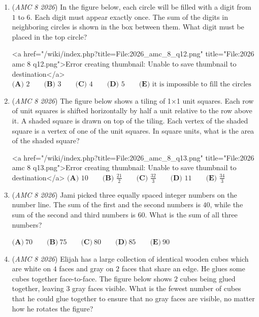 \begin{enumerate}
 <a href="/wiki/index.php?title=File:2026\_amc\_8\_q11.png" title="File:2026 amc 8 q11.png">Error creating thumbnail: Unable to save thumbnail to destination</a>$\textbf{(A) } 4\pi\qquad\textbf{(B) } 6\pi\qquad\textbf{(C) } \frac{13}{2}\pi\qquad\textbf{(D) } 8\pi\qquad\textbf{(E) } 13\pi$


	\item (\textit{AMC 8 2026}) In the figure below, each circle will be filled with a digit from $1$ to $6$. Each digit must appear exactly once.
The sum of the digits in neighboring circles is shown in the box between them.
What digit must be placed in the top circle?


 <a href="/wiki/index.php?title=File:2026\_amc\_8\_q12.png" title="File:2026 amc 8 q12.png">Error creating thumbnail: Unable to save thumbnail to destination</a>
$\textbf{(A) } 2\qquad\textbf{(B) } 3\qquad\textbf{(C) } 4\qquad\textbf{(D) } 5\qquad\textbf{(E) } \text{it is impossible to fill the circles}$


	\item (\textit{AMC 8 2026}) The figure below shows a tiling of 1×1 unit squares. Each row of unit squares is shifted horizontally by half a unit relative to the row above it. A shaded square is drawn on top of the tiling. Each vertex of the shaded square is a vertex of one of the unit squares. In square units, what is the area of the shaded square?


 <a href="/wiki/index.php?title=File:2026\_amc\_8\_q13.png" title="File:2026 amc 8 q13.png">Error creating thumbnail: Unable to save thumbnail to destination</a>
$\textbf{(A) } 10\qquad\textbf{(B) } \frac{21}{2}\qquad\textbf{(C) } \frac{32}{3}\qquad\textbf{(D) } 11\qquad\textbf{(E) } \frac{34}{3}$


	\item (\textit{AMC 8 2026}) Jami picked three equally spaced integer numbers on the number line. The sum of the first and the second numbers is $40$, while the sum of the second and third numbers is $60$. What is the sum of all three numbers?


 $\textbf{(A)}\ 70 \qquad \textbf{(B)}\ 75 \qquad \textbf{(C)}\ 80 \qquad \textbf{(D)}\ 85 \qquad \textbf{(E)}\ 90$


	\item (\textit{AMC 8 2026}) Elijah has a large collection of identical wooden cubes which are white on 
$4$ faces and gray on 
$2$ faces that share an edge. He glues some cubes together face-to-face. The figure below shows 
$2$ cubes being glued together, leaving 
$3$ gray faces visible. What is the fewest number of cubes that he could glue together to ensure that no gray faces are visible, no matter how he rotates the figure?



\end{enumerate}
